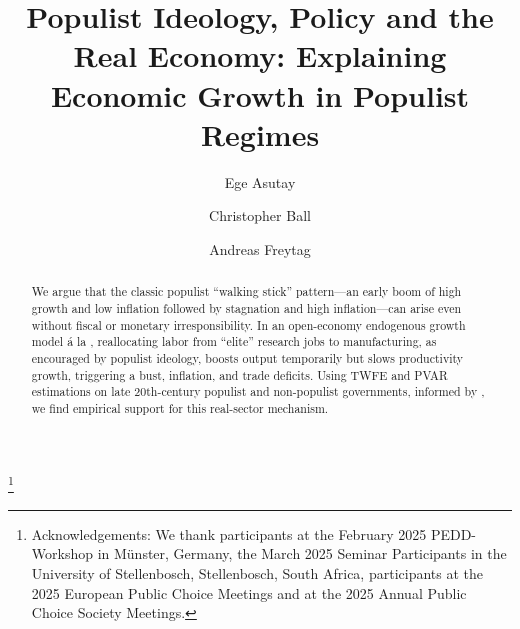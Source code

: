 \documentclass{OUP-EJ}
\begin{document}
\title[Populist Ideology, Policy and the Real Economy]{Populist Ideology, Policy and the Real Economy: Explaining Economic Growth in Populist Regimes}

\author[1]{Ege Asutay}

\author[2,*]{Christopher Ball}

\author[3]{Andreas Freytag}







\begin{abstract}
We argue that the classic populist ``walking stick'' pattern---an early boom of high growth and low inflation followed by stagnation and high inflation---can arise even without fiscal or monetary irresponsibility. In an open-economy endogenous growth model \'a la \cite{Romer1990}, reallocating labor from ``elite'' research jobs to manufacturing, as encouraged by populist ideology, boosts output temporarily but slows productivity growth, triggering a bust, inflation, and trade deficits. Using TWFE and PVAR estimations on late 20th-century populist and non-populist governments, informed by \cite{FunkeEtAl2023}, we find empirical support for this real-sector mechanism.
\end{abstract}



\thanks{Acknowledgements: We thank participants at the February 2025 PEDD-Workshop in M\"{u}nster, Germany, the March 2025 Seminar Participants in the University of Stellenbosch, Stellenbosch, South Africa, participants at the 2025 European Public Choice Meetings and at the 2025 Annual Public Choice Society Meetings.
}

\maketitle
\end{document}
